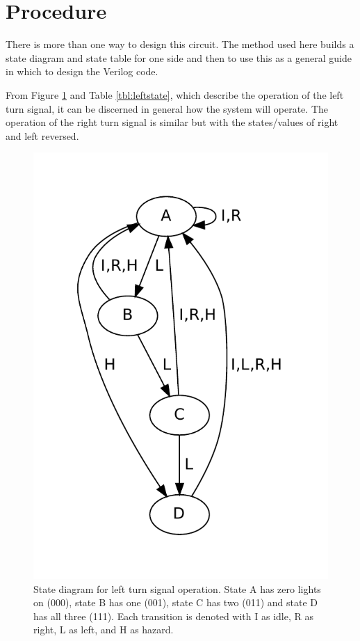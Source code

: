 \documentclass[12pt]{article}
\begin{document}

\section{Procedure}
\label{sec:procedure}

There is more than one way to design this circuit.
The method used here builds a state diagram and state table
for one side and then to use this as a general guide in
which to design the Verilog code.

From Figure \ref{fig:leftstate} and Table \ref{tbl:leftstate},
which describe the operation of the left turn signal,
it can be discerned in general how the system will operate.
The operation of the right turn signal is similar but with
the states/values of right and left reversed.

\begin{figure}[htbp!]
\begin{center}
\includegraphics[scale=0.7]{figures/left-signal}
\end{center}
\caption{State diagram for left turn signal operation.
State A has zero lights on (000), state B has one (001),
state C has two (011) and state D has all three (111).
Each transition is denoted with I as idle, R as right, L as left,
and H as hazard.}
\label{fig:leftstate}
\end{figure}
\end{document}
